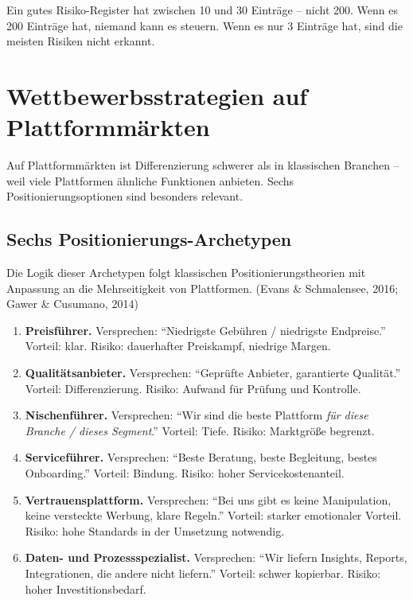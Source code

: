 \documentclass[11pt,a4paper,oneside]{article}
\newcommand{\fachbegriff}[1]{\textbf{#1}}
\newcommand{\quelle}[1]{{\footnotesize\color{lpGray}(#1)}}
\begin{document}
\begin{merkbox}
Ein gutes Risiko-Register hat zwischen 10 und 30 Einträge -- nicht 200. Wenn es 200 Einträge hat, niemand kann es steuern. Wenn es nur 3 Einträge hat, sind die meisten Risiken nicht erkannt.
\end{merkbox}

\section{Wettbewerbsstrategien auf Plattformmärkten}

Auf Plattformmärkten ist Differenzierung schwerer als in klassischen Branchen -- weil viele Plattformen ähnliche Funktionen anbieten. Sechs Positionierungsoptionen sind besonders relevant.

\subsection{Sechs Positionierungs-Archetypen}

Die Logik dieser Archetypen folgt klassischen Positionierungstheorien mit Anpassung an die Mehrseitigkeit von Plattformen. \quelle{Evans \& Schmalensee, 2016; Gawer \& Cusumano, 2014}

\begin{enumerate}
  \item \fachbegriff{Preisführer.} Versprechen: ``Niedrigste Gebühren / niedrigste Endpreise.'' Vorteil: klar. Risiko: dauerhafter Preiskampf, niedrige Margen.
  \item \fachbegriff{Qualitätsanbieter.} Versprechen: ``Geprüfte Anbieter, garantierte Qualität.'' Vorteil: Differenzierung. Risiko: Aufwand für Prüfung und Kontrolle.
  \item \fachbegriff{Nischenführer.} Versprechen: ``Wir sind die beste Plattform \emph{für diese Branche / dieses Segment}.'' Vorteil: Tiefe. Risiko: Marktgröße begrenzt.
  \item \fachbegriff{Serviceführer.} Versprechen: ``Beste Beratung, beste Begleitung, bestes Onboarding.'' Vorteil: Bindung. Risiko: hoher Servicekostenanteil.
  \item \fachbegriff{Vertrauensplattform.} Versprechen: ``Bei uns gibt es keine Manipulation, keine versteckte Werbung, klare Regeln.'' Vorteil: starker emotionaler Vorteil. Risiko: hohe Standards in der Umsetzung notwendig.
  \item \fachbegriff{Daten- und Prozessspezialist.} Versprechen: ``Wir liefern Insights, Reports, Integrationen, die andere nicht liefern.'' Vorteil: schwer kopierbar. Risiko: hoher Investitionsbedarf.
\end{enumerate}
\end{document}

